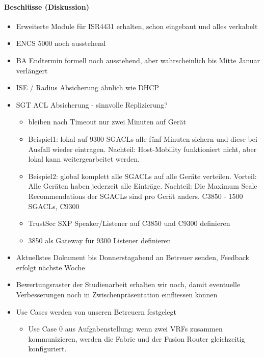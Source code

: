 \paragraph{Beschlüsse (Diskussion)}
\begin{itemize}	
	\item Erweiterte Module für ISR4431 erhalten, schon eingebaut und alles verkabelt
	\item ENCS 5000 noch ausstehend
	\item BA Endtermin formell noch ausstehend, aber wahrscheinlich bis Mitte Januar verlängert	
	\item ISE / Radius Absicherung ähnlich wie DHCP
	\item SGT ACL Absicherung - sinnvolle Replizierung?
	\begin{itemize}
		\item bleiben nach Timeout nur zwei Minuten auf Gerät
		\item Beispiel1: lokal auf 9300 SGACLs alle fünf Minuten sichern und diese bei Ausfall wieder eintragen. Nachteil: Host-Mobility funktioniert nicht, aber lokal kann weitergearbeitet werden.
		\item Beispiel2: global komplett alle SGACLs auf alle Geräte verteilen. Vorteil: Alle Geräten haben jederzeit alle Einträge. Nachteil: Die Maximum Scale Recommendations der SGACLs sind pro Gerät anders. C3850 - 1500 SGACLs, C9300 
		\item TrustSec SXP Speaker/Listener auf C3850 und C9300 definieren
		\item 3850 als Gateway  für 9300 Listener definieren
	\end{itemize}
	\item Aktuellstes Dokument bis Donnerstagabend an Betreuer senden, Feedback erfolgt nächste Woche
	\item Bewertungsraster der Studienarbeit erhalten wir noch, damit eventuelle Verbesserungen noch in Zwischenpräsentation einfliessen können
	\item Use Cases werden von unseren Betreuern festgelegt
	\begin{itemize}
		\item Use Case 0 aus Aufgabenstellung: wenn zwei VRFs zusammen kommunizieren, werden die Fabric und der Fusion Router gleichzeitig konfiguriert.
	\end{itemize}
\end{itemize}

